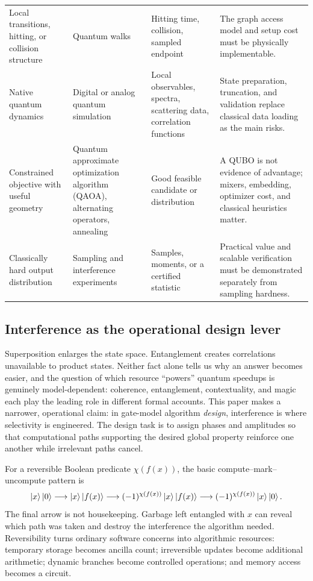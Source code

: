 \begin{longtable}{>{\raggedright\arraybackslash}p{} >{\raggedright\arraybackslash}p{} >{\raggedright\arraybackslash}p{} >{\raggedright\arraybackslash}p{}}
\addlinespace
Local transitions, hitting, or collision structure & Quantum walks & Hitting time, collision, sampled endpoint & The graph access model and setup cost must be physically implementable.\\
\addlinespace
Native quantum dynamics & Digital or analog quantum simulation & Local observables, spectra, scattering data, correlation functions & State preparation, truncation, and validation replace classical data loading as the main risks.\\
\addlinespace
Constrained objective with useful geometry & Quantum approximate optimization algorithm (QAOA), alternating operators, annealing & Good feasible candidate or distribution & A QUBO is not evidence of advantage; mixers, embedding, optimizer cost, and classical heuristics matter.\\
\addlinespace
Classically hard output distribution & Sampling and interference experiments & Samples, moments, or a certified statistic & Practical value and scalable verification must be demonstrated separately from sampling hardness.\\
\bottomrule
\end{longtable}

\subsection{Interference as the operational design lever}

Superposition enlarges the state space. Entanglement creates correlations unavailable to product states. Neither fact alone tells us why an answer becomes easier, and the question of which resource ``powers'' quantum speedups is genuinely model-dependent: coherence, entanglement, contextuality, and magic each play the leading role in different formal accounts. This paper makes a narrower, operational claim: in gate-model algorithm \emph{design}, interference is where selectivity is engineered. The design task is to assign phases and amplitudes so that computational paths supporting the desired global property reinforce one another while irrelevant paths cancel.

For a reversible Boolean predicate $\chi(f(x))$, the basic compute--mark--uncompute pattern is
\begin{equation}
\left|x\right\rangle\left|0\right\rangle
\longrightarrow \left|x\right\rangle\left|f(x)\right\rangle
\longrightarrow (-1)^{\chi(f(x))}\left|x\right\rangle\left|f(x)\right\rangle
\longrightarrow (-1)^{\chi(f(x))}\left|x\right\rangle\left|0\right\rangle.
\label{eq:uncompute}
\end{equation}
The final arrow is not housekeeping. Garbage left entangled with $x$ can reveal which path was taken and destroy the interference the algorithm needed. Reversibility turns ordinary software concerns into algorithmic resources: temporary storage becomes ancilla count; irreversible updates become additional arithmetic; dynamic branches become controlled operations; and memory access becomes a circuit.

